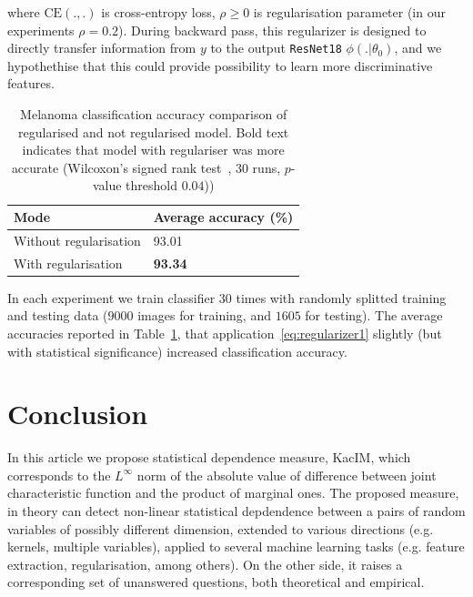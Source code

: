 \documentclass{article}
\newcommand{\CE}{\mathrm{CE}}
\begin{document}
{\noindent where $\CE(.,.)$ is cross-entropy loss, $\rho \geq 0$ is regularisation parameter (in our experiments $\rho = 0.2$). During backward pass, this regularizer is designed to directly transfer information from $y$ to the output \verb|ResNet18| $\phi(.|\theta_{0})$, and we hypothethise that this could provide possibility to learn more discriminative features.

\begin{table}	
	\centering
	\begin{tabular}{ |p{4cm}|p{3cm}|}
		\hline
		Mode & Average accuracy (\%)  \\
		\hline
		Without regularisation   &   93.01 \\		
		\hline
		With regularisation  &   \textbf{93.34} \\		
		\hline
	\end{tabular}
	\caption{Melanoma classification accuracy comparison of regularised and not regularised model. Bold text indicates that model with regulariser was more accurate (Wilcoxon's signed rank test~\cite{Wilcoxon1992}, 30 runs, $p$-value threshold $0.04$))}
	\label{table:regularisation_classification_accuracies}	
\end{table}


In each experiment we train classifier $30$ times with randomly splitted training and testing data ($9000$ images for training, and $1605$ for testing). The average accuracies reported in Table~\ref{table:regularisation_classification_accuracies}, that application~\eqref{eq:regularizer1} slightly (but with statistical significance) increased classification accuracy.

\section{Conclusion} 

\label{section:conclusion}
In this article we propose statistical dependence measure, KacIM, which corresponds to the $L^{\infty}$ norm of the absolute value of difference between joint characteristic function and the product of marginal ones. The proposed measure, in theory can detect non-linear statistical depdendence between a pairs of random variables of possibly different dimension, extended to various directions (e.g. kernels, multiple variables), applied to several machine learning tasks (e.g. feature extraction, regularisation, among others). On the other side, it raises a corresponding set of unanswered questions, both theoretical and empirical. 

}
\end{document}
